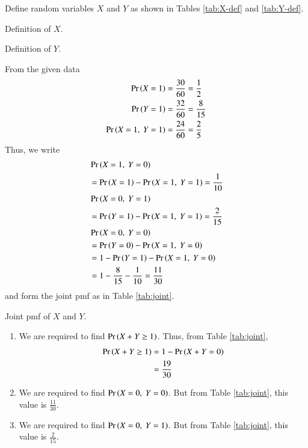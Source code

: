 \documentclass[journal,12pt,twocolumn]{IEEEtran}
\begin{document}
\begin{enumerate}
    \solution Define random variables $X$ and $Y$ as shown
    in Tables \ref{tab:X-def} and \ref{tab:Y-def}.
    \begin{table}[!ht]
        \centering
        
        \caption{Definition of $X$.}
        \label{tab:X-def}
    \end{table}
    \begin{table}[!ht]
        \centering
        
        \caption{Definition of $Y$.}
        \label{tab:Y-def}
    \end{table}
    From the given data
    \begin{align}
        \Pr\left(X=1\right) &= \frac{30}{60} = \frac{1}{2} \label{eq:pr-X} \\
        \Pr\left(Y=1\right) &= \frac{32}{60} = \frac{8}{15} \label{eq:pr-Y} \\
        \Pr\left(X=1,\ Y=1\right) &= \frac{24}{60} = \frac{2}{5} \label{eq:pr-XY}
    \end{align}
    Thus, we write
    \begin{align}
        &\Pr\left(X=1,\ Y=0\right) \nonumber \\
        &= \Pr\left(X=1\right) - \Pr\left(X=1,\ Y=1\right) = \frac{1}{10} \\
        &\Pr\left(X=0,\ Y=1\right) \nonumber \\
        &= \Pr\left(Y=1\right) - \Pr\left(X=1,\ Y=1\right) = \frac{2}{15} \\
        &\Pr\left(X=0,\ Y=0\right) \nonumber \\
        &= \Pr\left(Y=0\right) - \Pr\left(X=1,\ Y=0\right) \\
        &= 1 - \Pr\left(Y=1\right) - \Pr\left(X=1,\ Y=0\right) \\
        &= 1 - \frac{8}{15} - \frac{1}{10} = \frac{11}{30}
    \end{align}
    and form the joint pmf as in Table \ref{tab:joint}.
    \begin{table}[!ht]
        \centering
        
        \caption{Joint pmf of $X$ and $Y$.}
        \label{tab:joint}
    \end{table}
    \begin{enumerate}
        \item We are required to find $\Pr\left(X+Y\ge1\right)$. Thus, from Table 
        \ref{tab:joint},
        \begin{align}
            \Pr\left(X+Y\ge1\right) &= 1 - \Pr\left(X+Y=0\right) \\
                         &= \frac{19}{30}
        \end{align}
        
        \item We are required to find $\pr{X=0,\ Y=0}$. But from Table \ref{tab:joint},
        this value is $\frac{11}{30}$.

        \item We are required to find $\pr{X=0,\ Y=1}$. But from Table \ref{tab:joint},
        this value is $\frac{2}{15}$.
    \end{enumerate}
\end{enumerate}
\end{document}
